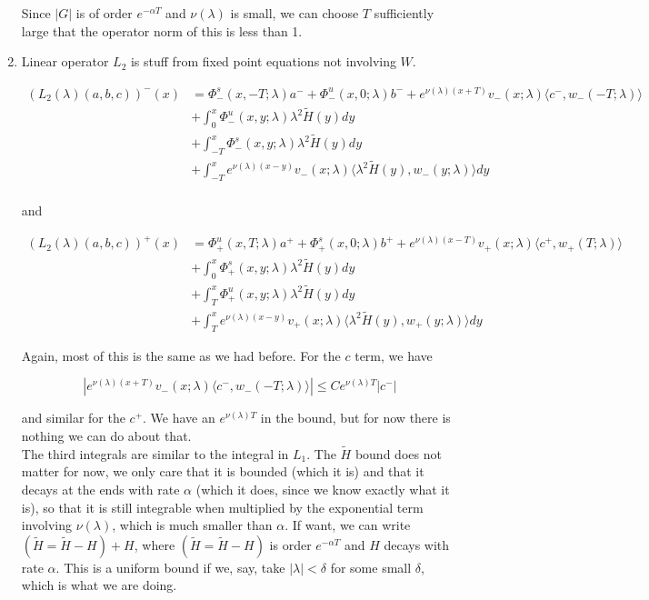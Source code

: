 \documentclass[12pt]{article}
\begin{document}
\begin{enumerate}
Since $|G|$ is of order $e^{-\alpha T}$ and $\nu(\lambda)$ is small, we can choose $T$ sufficiently large that the operator norm of this is less than 1.

\item Linear operator $L_2$ is stuff from fixed point equations not involving $W$.


\begin{align*}
(L_2(\lambda)(a,b,c))^-(x) &= \Phi^s_-(x, -T; \lambda)a^- + \Phi^u_-(x, 0; \lambda)b^- + e^{\nu(\lambda)(x+T)} v_-(x; \lambda) \langle c^-, w_-(-T; \lambda) \rangle \\
&+ \int_0^x \Phi^u_-(x, y; \lambda) \lambda^2 \tilde{H}(y) dy \\
&+ \int_{-T}^x \Phi^s_-(x, y; \lambda) \lambda^2 \tilde{H}(y) dy \\
&+ \int_{-T}^x 
e^{\nu(\lambda)(x-y)} v_-(x; \lambda) \langle \lambda^2 \tilde{H}(y), w_-(y; \lambda) \rangle dy \\
\end{align*}

and

\begin{align*}
(L_2(\lambda)(a,b,c))^+(x) &= \Phi^u_+(x, T; \lambda)a^+ + \Phi^s_+(x, 0; \lambda)b^+ + e^{\nu(\lambda)(x - T)} v_+(x; \lambda) \langle c^+, w_+(T; \lambda) \rangle\\
&+ \int_0^x \Phi^s_+(x, y; \lambda) \lambda^2 \tilde{H}(y) dy \\
&+ \int_T^x \Phi^u_+(x, y; \lambda) \lambda^2 \tilde{H}(y) dy \\
&+ \int_T^x e^{\nu(\lambda)(x-y)} v_+(x; \lambda) \langle \lambda^2 \tilde{H}(y), w_+(y; \lambda) \rangle dy
\end{align*}

Again, most of this is the same as we had before. For the $c$ term, we have 

\[
|e^{\nu(\lambda)(x+T)} v_-(x; \lambda) \langle c^-, w_-(-T; \lambda) \rangle | \leq C e^{\nu(\lambda)T}|c^-|
\]

and similar for the $c^+$. We have an $e^{\nu(\lambda)T}$ in the bound, but for now there is nothing we can do about that.
\\

The third integrals are similar to the integral in $L_1$. The $\tilde{H}$ bound does not matter for now, we only care that it is bounded (which it is) and that it decays at the ends with rate $\alpha$ (which it does, since we know exactly what it is), so that it is still integrable when multiplied by the exponential term involving $\nu(\lambda)$, which is much smaller than $\alpha$. If want, we can write $(\tilde{H} = \tilde{H} - H) + H$, where $(\tilde{H} = \tilde{H} - H)$ is order $e^{-\alpha T}$ and $H$ decays with rate $\alpha.$ This is a uniform bound if we, say, take $|\lambda| < \delta$ for some small $\delta$, which is what we are doing.
\\


\end{enumerate}
\end{document}
